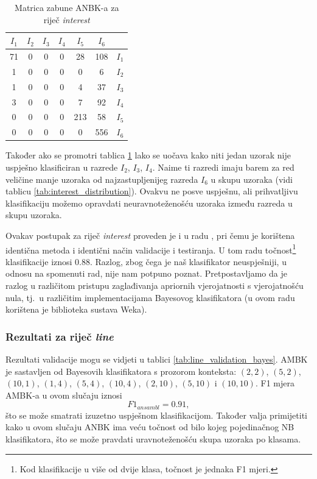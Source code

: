 \documentclass[10pt, a4paper]{article}
\begin{document}
\begin{table}[!hbtp]
\caption{Matrica zabune ANBK-a za riječ \emph{interest}}
\label{tab:interest_confusion_bayes}
\begin{center}
\begin{tabular}{|cccccc|c|}
\hline
$I_1$ & $I_2$ & $I_3$ & $I_4$ & $I_5$ & $I_6$ &  \\
\hline
  71  & 0 &  0 &  0 & 28  & 108 &   $I_1$  \\
   1  & 0 &  0 &  0 &  0  &  6  &   $I_2$  \\
   1  & 0 &  0 &  0 &  4  & 37  &   $I_3$  \\
   3  & 0 &  0 &  0 &  7  & 92  &   $I_4$  \\
   0  & 0 &  0 &  0 & 213 & 58  &   $I_5$  \\
   0  & 0 &  0 &  0 &  0  & 556 &   $I_6$  \\
\hline
\end{tabular}
\end{center}
\end{table}

Također ako se promotri tablica \ref{tab:interest_confusion_bayes} lako se uočava
kako niti jedan uzorak nije uspješno klasificiran u razrede $I_2$, $I_3$, $I_4$.
Naime ti razredi imaju barem za red veličine manje uzoraka od najzastupljenijeg razreda $I_6$
u skupu uzoraka (vidi tablicu \ref{tab:interest_distribution}). Ovakvu ne posve
uspješnu, ali prihvatljivu klasifikaciju možemo opravdati neuravnoteženošću uzoraka
između razreda u skupu uzoraka.

Ovakav postupak za riječ \emph{interest} proveden je i u radu \citep{pedersen}, pri
čemu je korištena identična metoda i identični način validacije i testiranja. 
U tom radu točnost\footnote{Kod klasifikacije u više od dvije klasa, točnost je jednaka F1 mjeri.} klasifikacije iznosi $0.88$. 
Razlog, zbog čega je naš klasifikator neuspješniji, u odnosu na spomenuti rad, nije nam 
potpuno poznat. Pretpostavljamo da je razlog u različitom pristupu zaglađivanja
apriornih vjerojatnosti s vjerojatnošću nula, tj.~u različitim
implementacijama Bayesovog klasifikatora (u ovom radu korištena
je biblioteka sustava Weka). 

\subsubsection{Rezultati za riječ \emph{line}} 
Rezultati validacije mogu se vidjeti u tablici \ref{tab:line_validation_bayes}.
AMBK je sastavljen od Bayesovih klasifikatora s prozorom konteksta: $(2,2)$,
$(5,2)$, $(10,1)$, $(1,4)$, $(5,4)$, $(10,4)$, $(2,10)$, $(5,10)$ i $(10,10)$.
F1 mjera AMBK-a u ovom slučaju iznosi
\begin{equation}
\label{eq:F1_ansambl_line}
F1_{ansambl} = 0.91,
\end{equation}
što se može smatrati izuzetno uspješnom klasifikacijom. 
Također valja primijetiti kako u ovom slučaju ANBK ima veću točnost
od bilo kojeg pojedinačnog NB klasifikatora, što
se može pravdati uravnoteženošću skupa uzoraka po klasama.
\end{document}
